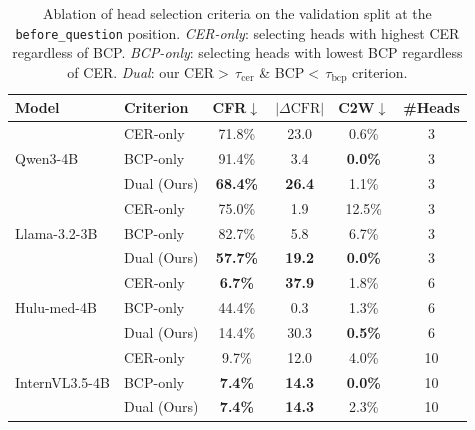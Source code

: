 \begin{table}[t]
\centering
\caption{Ablation of head selection criteria on the validation split at the \texttt{before\_question} position. \textit{CER-only}: selecting heads with highest CER regardless of BCP. \textit{BCP-only}: selecting heads with lowest BCP regardless of CER. \textit{Dual}: our CER$>$\,$\tau_{\text{cer}}$ \& BCP$<$\,$\tau_{\text{bcp}}$ criterion.}
\label{tab:ablation_criteria}
\begin{tabular}{llcccc}
\toprule
\textbf{Model} & \textbf{Criterion} & \textbf{CFR$\downarrow$} & \textbf{$\left|\Delta\mathrm{CFR}\right|$} & \textbf{C2W$\downarrow$} & \textbf{\#Heads} \\
\midrule
\multirow{3}{*}{Qwen3-4B} & CER-only & 71.8\% & 23.0 & 0.6\% & 3 \\
& BCP-only & 91.4\% & 3.4 & \textbf{0.0\%} & 3 \\
& Dual (Ours) & \textbf{68.4\%} & \textbf{26.4} & 1.1\% & 3 \\
\midrule
\multirow{3}{*}{Llama-3.2-3B} & CER-only & 75.0\% & 1.9 & 12.5\% & 3 \\
& BCP-only & 82.7\% & 5.8 & 6.7\% & 3 \\
& Dual (Ours) & \textbf{57.7\%} & \textbf{19.2} & \textbf{0.0\%} & 3 \\
\midrule
\multirow{3}{*}{Hulu-med-4B} & CER-only & \textbf{6.7\%} & \textbf{37.9} & 1.8\% & 6 \\
& BCP-only & 44.4\% & 0.3 & 1.3\% & 6 \\
& Dual (Ours) & 14.4\% & 30.3 & \textbf{0.5\%} & 6 \\
\midrule
\multirow{3}{*}{InternVL3.5-4B} & CER-only & 9.7\% & 12.0 & 4.0\% & 10 \\
& BCP-only & \textbf{7.4\%} & \textbf{14.3} & \textbf{0.0\%} & 10 \\
& Dual (Ours) & \textbf{7.4\%} & \textbf{14.3} & 2.3\% & 10 \\
\bottomrule
\end{tabular}
\end{table}
